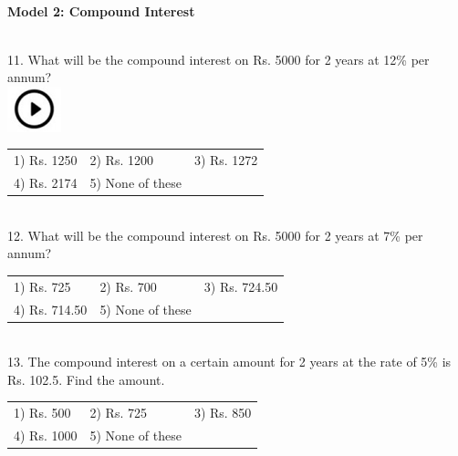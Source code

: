 \documentclass{article}
\begin{document}
	
	
	
	\noindent 
	
	\noindent 
	
	\noindent 
	
	\noindent 
	
	\noindent 
	
	\noindent 
	
	\noindent \\  \textbf{Model 2: Compound Interest}
	
	\noindent 
	
	\noindent  \\ 
	
	11. What will be the compound interest on Rs. 5000 for 2 years at 12\% per annum?  
\noindent \\ \includegraphics*[width=0.61in, height=0.52in]{images/image1}\begin{tabular}{p{1.7in} p{1.6in} p{1.6in}} \\ 
 1) Rs. 1250                 &  2) Rs. 1200          &  3) Rs. 1272          \\
4) Rs. 2174          & 5) None of these  \\
\end{tabular}
	
	\noindent 
	
	\noindent \\  12. What will be the compound interest on Rs. 5000 for 2 years at 7\% per annum?
	
	\noindent 
	
	\noindent \begin{tabular}{p{1.7in} p{1.6in} p{1.6in}} \\ 
 1) Rs. 725                   &  2) Rs. 700            &  3) Rs. 724.50       \\
4) Rs. 714.50       & 5) None of these  \\
\end{tabular}
	
	\noindent 
	
	\noindent 
	
	\noindent \\  13. The compound interest on a certain amount for 2 years at the rate of 5\% is Rs. 102.5. Find the amount.
	
	\noindent \begin{tabular}{p{1.7in} p{1.6in} p{1.6in}} \\ 
 1) Rs. 500                   &  2) Rs. 725            &  3) Rs. 850            \\
4) Rs. 1000          & 5) None of these  \\
\end{tabular}
	
\end{document}
